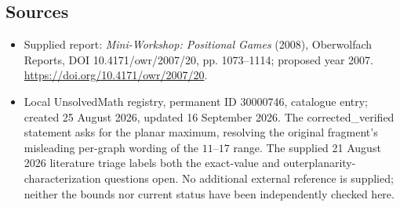 \documentclass[11pt]{article}
\begin{document}
\subsection{Sources}
\begin{itemize}
\item Supplied report: \emph{Mini-Workshop: Positional Games} (2008), Oberwolfach Reports, DOI 10.4171/owr/2007/20, pp. 1073--1114; proposed year 2007. \url{https://doi.org/10.4171/owr/2007/20}.
\item Local UnsolvedMath registry, permanent ID 30000746, catalogue entry; created 25 August 2026, updated 16 September 2026. The corrected\_verified statement asks for the planar maximum, resolving the original fragment's misleading per-graph wording of the $11$--$17$ range. The supplied 21 August 2026 literature triage labels both the exact-value and outerplanarity-characterization questions open. No additional external reference is supplied; neither the bounds nor current status have been independently checked here.
\end{itemize}
\end{document}
